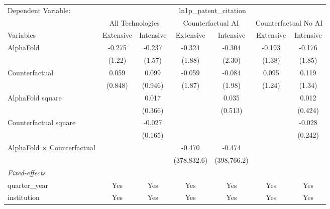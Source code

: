 \begingroup
\centering
\begin{tabular}{lcccccc}
   \tabularnewline \midrule \midrule
   Dependent Variable: & \multicolumn{6}{c}{ln1p\_patent\_citation}\\
 & \multicolumn{2}{c}{All Technologies} & \multicolumn{2}{c}{Counterfactual AI} & \multicolumn{2}{c}{Counterfactual No AI} \\
\cmidrule(lr){1-1}\cmidrule(lr){2-3} \cmidrule(lr){4-5} \cmidrule(lr){6-7}
Variables & \multicolumn{1}{c}{Extensive} & \multicolumn{1}{c}{Intensive} & \multicolumn{1}{c}{Extensive} & \multicolumn{1}{c}{Intensive} & \multicolumn{1}{c}{Extensive} & \multicolumn{1}{c}{Intensive} \\
\cmidrule(lr){1-1}\cmidrule(lr){2-2} \cmidrule(lr){3-3} \cmidrule(lr){4-4} \cmidrule(lr){5-5} \cmidrule(lr){6-6} \cmidrule(lr){7-7}
   AlphaFold                          & -0.275  & -0.237  & -0.324      & -0.304      & -0.193 & -0.176\\   
                                      & (1.22)  & (1.57)  & (1.88)      & (2.30)      & (1.38) & (1.85)\\   
   Counterfactual                     & 0.059   & 0.099   & -0.059      & -0.084      & 0.095  & 0.119\\   
                                      & (0.848) & (0.946) & (1.87)      & (1.98)      & (1.24) & (1.34)\\   
   AlphaFold square                   &         & 0.017   &             & 0.035       &        & 0.012\\   
                                      &         & (0.366) &             & (0.513)     &        & (0.424)\\   
   Counterfactual square              &         & -0.027  &             &             &        & -0.028\\   
                                      &         & (0.165) &             &             &        & (0.242)\\   
   AlphaFold $\times$ Counterfactual  &         &         & -0.470      & -0.474      &        &   \\   
                                      &         &         & (378,832.6) & (398,766.2) &        &   \\   
   \midrule
   \emph{Fixed-effects}\\
   quarter\_year                      & Yes     & Yes     & Yes         & Yes         & Yes    & Yes\\  
   institution                        & Yes     & Yes     & Yes         & Yes         & Yes    & Yes\\  

\end{tabular}
